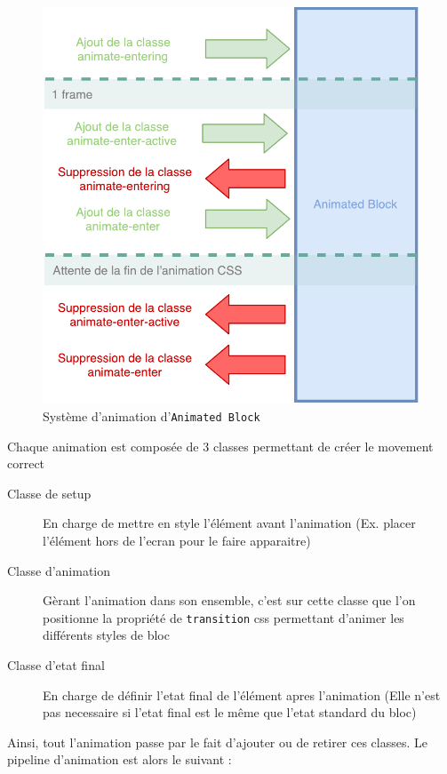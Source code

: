 \begin{figure}[h]
    \centering
    \includegraphics[scale=0.5]{img/animated-block.pdf}
    \caption{Système d'animation d'\texttt{Animated Block}}
\end{figure}

Chaque animation est composée de 3 classes permettant de créer le movement correct

\begin{description}
    \item[Classe de setup] En charge de mettre en style l'élément avant l'animation (Ex. placer l'élément hors de l'ecran pour le faire apparaitre)
    \item[Classe d'animation] Gèrant l'animation dans son ensemble, c'est sur cette classe que l'on positionne la propriété de \texttt{transition} css permettant d'animer les différents styles de bloc
    \item[Classe d'etat final] En charge de définir l'etat final de l'élément apres l'animation (Elle n'est pas necessaire si l'etat final est le même que l'etat standard du bloc)
\end{description}

Ainsi, tout l'animation passe par le fait d'ajouter ou de retirer ces classes.
Le pipeline d'animation est alors le suivant :

